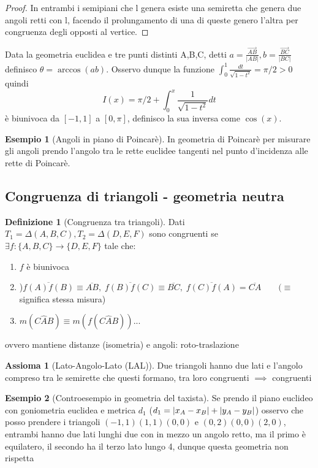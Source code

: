 \documentclass[a4paper,10pt]{article}
\theoremstyle{definition}
\theoremstyle{indentdefinition}
\newtheorem{defn}{Definizione}[section]
\theoremstyle{indentpostulate}
\newtheorem{axiom}{Assioma}[section]
\theoremstyle{indenttheorem}
\theoremstyle{myremark}
\newtheorem{example*}{Esempio}
\theoremstyle{indentgeneral}
\begin{document}
\begin{proof}
    In entrambi i semipiani che l genera esiste una semiretta che genera due angoli retti con l, facendo il prolungamento di una di queste genero l'altra per congruenza degli opposti al vertice.
\end{proof}


Data la geometria euclidea e tre punti distinti A,B,C, detti $a= \frac{\overrightarrow{AB}}{|AB|},b=\frac{\overrightarrow{BC}}{|BC|}$ definisco $\theta = \arccos(ab)$. Osservo dunque la funzione $\int_0^1\frac{dt}{\sqrt{1-t^2}}=\pi/2>0$ quindi  $$I(x)=\pi /2 + \int_0^x\frac{1}{\sqrt{1-t^2}}dt$$
è biunivoca da $[-1,1]$ a $[0,\pi]$, definisco la sua inversa come $\cos(x)$. 

\begin{example*}[Angoli in piano di Poincarè]
    In geometria di Poincarè per misurare gli angoli prendo l'angolo tra le rette euclidee tangenti nel punto d'incidenza alle rette di Poincarè.
\end{example*}

\subsection{Congruenza di triangoli - geometria neutra}
\begin{defn}[Congruenza tra triangoli]
    Dati $T_1=\Delta (A,B,C), T_2=\Delta (D,E,F)$ sono congruenti se $\exists f:\{ A,B,C \} \rightarrow \{ D,E,F \}$ tale che:
    \begin{enumerate}
        \item $f$ è biunivoca
        \item )$\overline{f(A)f(B)}\equiv \overline{AB},\; \overline{f(B)f(C)} \equiv \overline{BC},\; \overline{f(C)f(A)}=\overline{CA} \qquad (\equiv$ significa stessa misura)
        \item $m(C\hat{A}B)\equiv m(f(C\hat{A}B))...$
    \end{enumerate}
    ovvero mantiene distanze (isometria) e angoli: roto-traslazione
\end{defn}

\begin{axiom}[Lato-Angolo-Lato (LAL)]\label{axm-lal}
     Due triangoli hanno due lati e l'angolo compreso tra le semirette che questi formano, tra loro congruenti $\implies$ congruenti
\end{axiom} 


\begin{example*}[Controesempio in geometria del taxista]
    Se prendo il piano euclideo con goniometria euclidea e metrica $d_1$ ($d_1=\abs{x_A-x_B}+\abs{y_A-y_B}$) osservo che posso prendere i triangoli $(-1,1)(1,1)(0,0)$ e $(0,2)(0,0)(2,0)$, entrambi hanno due lati lunghi due con in mezzo un angolo retto, ma il primo è equilatero, il secondo ha il terzo lato lungo 4, dunque questa geometria non rispetta 
\end{example*}
\end{document}
